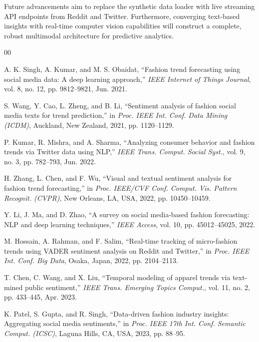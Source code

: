 \documentclass[conference]{IEEEtran}
\begin{document}
Future advancements aim to replace the synthetic data loader with live streaming API endpoints from Reddit and Twitter. Furthermore, converging text-based insights with real-time computer vision capabilities will construct a complete, robust multimodal architecture for predictive analytics.

\begin{thebibliography}{00}

A. K. Singh, A. Kumar, and M. S. Obaidat, ``Fashion trend forecasting using social media data: A deep learning approach,'' \textit{IEEE Internet of Things Journal}, vol. 8, no. 12, pp. 9812--9821, Jun. 2021.

S. Wang, Y. Cao, L. Zheng, and B. Li, ``Sentiment analysis of fashion social media texts for trend prediction,'' in \textit{Proc. IEEE Int. Conf. Data Mining (ICDM)}, Auckland, New Zealand, 2021, pp. 1120--1129.

P. Kumar, R. Mishra, and A. Sharma, ``Analyzing consumer behavior and fashion trends via Twitter data using NLP,'' \textit{IEEE Trans. Comput. Social Syst.}, vol. 9, no. 3, pp. 782--793, Jun. 2022.

H. Zhang, L. Chen, and F. Wu, ``Visual and textual sentiment analysis for fashion trend forecasting,'' in \textit{Proc. IEEE/CVF Conf. Comput. Vis. Pattern Recognit. (CVPR)}, New Orleans, LA, USA, 2022, pp. 10450--10459.

Y. Li, J. Ma, and D. Zhao, ``A survey on social media-based fashion forecasting: NLP and deep learning techniques,'' \textit{IEEE Access}, vol. 10, pp. 45012--45025, 2022.

M. Hossain, A. Rahman, and F. Salim, ``Real-time tracking of micro-fashion trends using VADER sentiment analysis on Reddit and Twitter,'' in \textit{Proc. IEEE Int. Conf. Big Data}, Osaka, Japan, 2022, pp. 2104--2113.

T. Chen, C. Wang, and X. Liu, ``Temporal modeling of apparel trends via text-mined public sentiment,'' \textit{IEEE Trans. Emerging Topics Comput.}, vol. 11, no. 2, pp. 433--445, Apr. 2023.

K. Patel, S. Gupta, and R. Singh, ``Data-driven fashion industry insights: Aggregating social media sentiments,'' in \textit{Proc. IEEE 17th Int. Conf. Semantic Comput. (ICSC)}, Laguna Hills, CA, USA, 2023, pp. 88--95.

\end{thebibliography}
\end{document}
